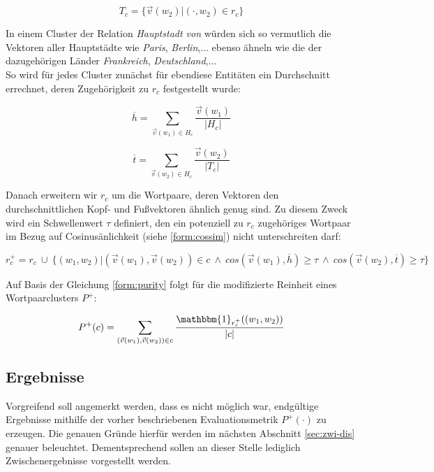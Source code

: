 \begin{equation}
T_c = \{\vec{v}(w_2)|(\cdot, w_2) \in r_c\}
\end{equation}

In einem Cluster der Relation \emph{Hauptstadt von} würden sich so vermutlich die Vektoren aller Hauptstädte wie
\emph{Paris}, \emph{Berlin},$\ldots$ ebenso ähneln wie die der dazugehörigen
Länder \emph{Frankreich}, \emph{Deutschland},$\ldots$\\
So wird für jedes Cluster zunächst für ebendiese Entitäten ein Durchschnitt
errechnet, deren Zugehörigkeit zu $r_c$ festgestellt wurde:

\begin{equation}
  \overline{h} = \sum_{\vec{v}(w_1) \in H_c}\frac{\vec{v}(w_1)}{|H_c|}
\end{equation}

\begin{equation}
  \overline{t} = \sum_{\vec{v}(w_2) \in H_c}\frac{\vec{v}(w_2)}{|T_c|}
\end{equation}

Danach erweitern wir $r_c$ um die Wortpaare, deren Vektoren den durchschnittlichen Kopf- und Fußvektoren ähnlich genug sind.
Zu diesem Zweck wird ein Schwellenwert $\tau$ definiert, den ein potenziell zu $r_c$ zugehöriges Wortpaar im Bezug auf
Cosinusänlichkeit (siehe \ref{form:cossim}) nicht unterschreiten darf:

\begin{equation}
  r_c^+ = r_c\ \cup\ \{(w_1, w_2)| (\vec{v}(w_1), \vec{v}(w_2)) \in c\ \land\ cos(\vec{v}(w_1), \overline{h}) \geq \tau\ \land\ cos(\vec{v}(w_2), \overline{t}) \geq \tau\}
\end{equation}

Auf Basis der Gleichung \ref{form:purity} folgt für die modifizierte Reinheit eines Wortpaarclusters $P^+$:

\begin{equation}
  P^+(c) = \sum_{(\vec{v}(w_1), \vec{v}(w_2)) \in c} \frac{\mathbbm{1}_{r_c^+}((w_1, w_2))}{|c|}
\end{equation}

\subsection{Ergebnisse}

Vorgreifend soll angemerkt werden, dass es nicht möglich war, endgültige Ergebnisse mithilfe der vorher beschriebenen
Evaluationsmetrik $P^+(\cdot)$ zu erzeugen. Die genauen Gründe hierfür werden im nächsten Abschnitt \ref{sec:zwi-dis}
genauer beleuchtet. Dementsprechend sollen an dieser Stelle lediglich Zwischenergebnisse vorgestellt werden.\\

